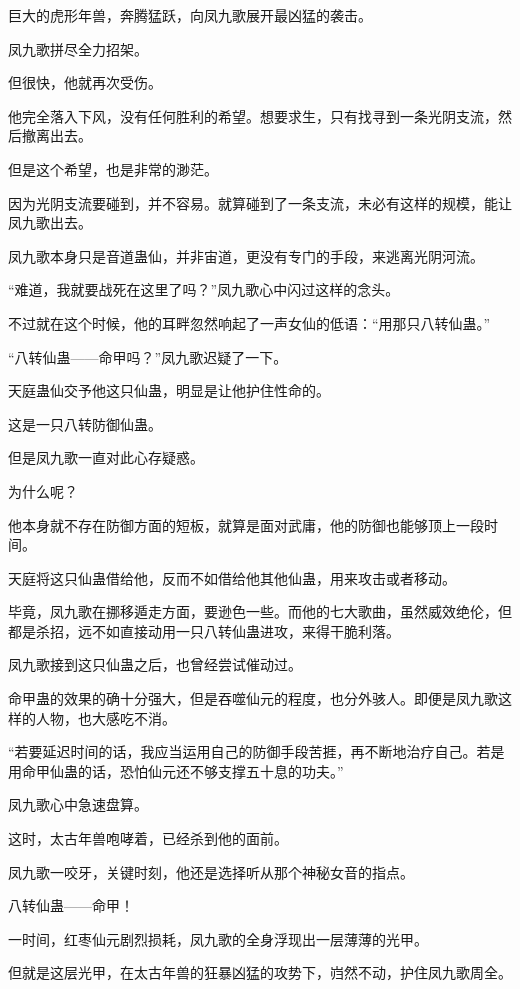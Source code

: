 \begin{this_body}
巨大的虎形年兽，奔腾猛跃，向凤九歌展开最凶猛的袭击。

凤九歌拼尽全力招架。

但很快，他就再次受伤。

他完全落入下风，没有任何胜利的希望。想要求生，只有找寻到一条光阴支流，然后撤离出去。

但是这个希望，也是非常的渺茫。

因为光阴支流要碰到，并不容易。就算碰到了一条支流，未必有这样的规模，能让凤九歌出去。

凤九歌本身只是音道蛊仙，并非宙道，更没有专门的手段，来逃离光阴河流。

“难道，我就要战死在这里了吗？”凤九歌心中闪过这样的念头。

不过就在这个时候，他的耳畔忽然响起了一声女仙的低语：“用那只八转仙蛊。”

“八转仙蛊——命甲吗？”凤九歌迟疑了一下。

天庭蛊仙交予他这只仙蛊，明显是让他护住性命的。

这是一只八转防御仙蛊。

但是凤九歌一直对此心存疑惑。

为什么呢？

他本身就不存在防御方面的短板，就算是面对武庸，他的防御也能够顶上一段时间。

天庭将这只仙蛊借给他，反而不如借给他其他仙蛊，用来攻击或者移动。

毕竟，凤九歌在挪移遁走方面，要逊色一些。而他的七大歌曲，虽然威效绝伦，但都是杀招，远不如直接动用一只八转仙蛊进攻，来得干脆利落。

凤九歌接到这只仙蛊之后，也曾经尝试催动过。

命甲蛊的效果的确十分强大，但是吞噬仙元的程度，也分外骇人。即便是凤九歌这样的人物，也大感吃不消。

“若要延迟时间的话，我应当运用自己的防御手段苦捱，再不断地治疗自己。若是用命甲仙蛊的话，恐怕仙元还不够支撑五十息的功夫。”

凤九歌心中急速盘算。

这时，太古年兽咆哮着，已经杀到他的面前。

凤九歌一咬牙，关键时刻，他还是选择听从那个神秘女音的指点。

八转仙蛊——命甲！

一时间，红枣仙元剧烈损耗，凤九歌的全身浮现出一层薄薄的光甲。

但就是这层光甲，在太古年兽的狂暴凶猛的攻势下，岿然不动，护住凤九歌周全。


\end{this_body}
